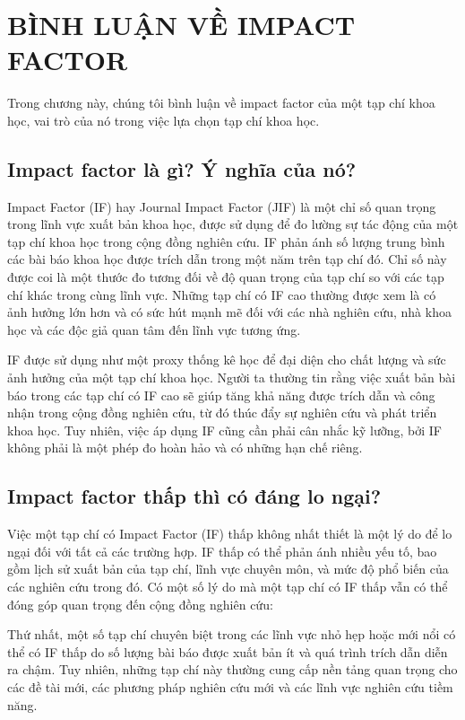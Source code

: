 \chapter{BÌNH LUẬN VỀ IMPACT FACTOR}

Trong chương này, chúng tôi bình luận về impact factor của một tạp chí khoa học, vai trò của nó trong việc lựa chọn tạp chí khoa học.


\section{Impact factor là gì? Ý nghĩa của nó?}

Impact Factor (IF) hay Journal Impact Factor (JIF) là một chỉ số quan trọng trong lĩnh vực xuất bản khoa học, được sử dụng để đo lường sự tác động của một tạp chí khoa học trong cộng đồng nghiên cứu. IF phản ánh số lượng trung bình các bài báo khoa học được trích dẫn trong một năm trên tạp chí đó. Chỉ số này được coi là một thước đo tương đối về độ quan trọng của tạp chí so với các tạp chí khác trong cùng lĩnh vực. Những tạp chí có IF cao thường được xem là có ảnh hưởng lớn hơn và có sức hút mạnh mẽ đối với các nhà nghiên cứu, nhà khoa học và các độc giả quan tâm đến lĩnh vực tương ứng.

IF được sử dụng như một proxy thống kê học để đại diện cho chất lượng và sức ảnh hưởng của một tạp chí khoa học. Người ta thường tin rằng việc xuất bản bài báo trong các tạp chí có IF cao sẽ giúp tăng khả năng được trích dẫn và công nhận trong cộng đồng nghiên cứu, từ đó thúc đẩy sự nghiên cứu và phát triển khoa học. Tuy nhiên, việc áp dụng IF cũng cần phải cân nhắc kỹ lưỡng, bởi IF không phải là một phép đo hoàn hảo và có những hạn chế riêng.


\section{Impact factor thấp thì có đáng lo ngại?}

Việc một tạp chí có Impact Factor (IF) thấp không nhất thiết là một lý do để lo ngại đối với tất cả các trường hợp. IF thấp có thể phản ánh nhiều yếu tố, bao gồm lịch sử xuất bản của tạp chí, lĩnh vực chuyên môn, và mức độ phổ biến của các nghiên cứu trong đó. Có một số lý do mà một tạp chí có IF thấp vẫn có thể đóng góp quan trọng đến cộng đồng nghiên cứu:

Thứ nhất, một số tạp chí chuyên biệt trong các lĩnh vực nhỏ hẹp hoặc mới nổi có thể có IF thấp do số lượng bài báo được xuất bản ít và quá trình trích dẫn diễn ra chậm. Tuy nhiên, những tạp chí này thường cung cấp nền tảng quan trọng cho các đề tài mới, các phương pháp nghiên cứu mới và các lĩnh vực nghiên cứu tiềm năng.

